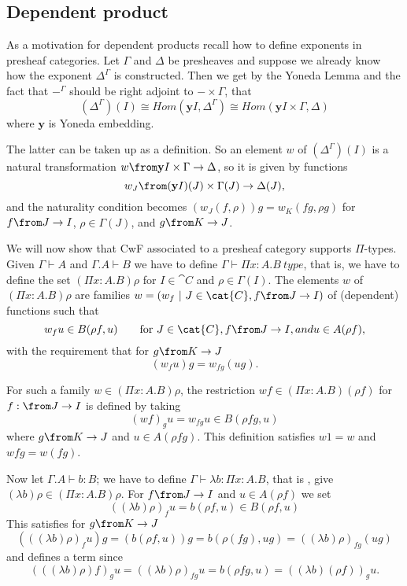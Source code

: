 \subsection*{Dependent product}

As a motivation for dependent products recall how to define exponents in
presheaf categories. Let $\Gamma$ and $\Delta$ be presheaves and suppose we
already know how the exponent $\Delta^\Gamma$ is constructed. Then we get by
the Yoneda Lemma and the fact that $-^\Gamma$ should be right adjoint to $-
\times \Gamma$, that
\[
  (\Delta^\Gamma)(I) \cong Hom(\mathbf{y}I, \Delta^\Gamma) \cong Hom(\mathbf{y}I \times \Gamma, \Delta)
\]
where $\mathbf{y}$ is Yoneda embedding.

The latter can be taken up as a definition. So an element $w$ of
$(\Delta^\Gamma)(I)$ is a natural transformation $w \from \mathbf{y}I\times
\Gamma \to \Delta$, so it is given by functions
\[
  w_J \from (\mathbf{y}I)(J) \times \Gamma(J) \to \Delta(J),
\]
and the naturality condition becomes $(w_J(f, \rho))g = w_K(fg, \rho g)$ for $f
\from J \to I$, $\rho \in \Gamma(J)$, and $g \from K \to J$.

We will now show that CwF associated to a presheaf category supports
$\Pi$-types. Given $\Gamma \vdash A$ and $\Gamma.A \vdash B$ we have to define
$\Gamma \vdash \Pi x: A. B~type$, that is, we have to define the set $(\Pi x:
A.B) \rho$ for $I \in \cat{C}$ and $\rho \in \Gamma(I)$. The elements $w$ of
$(\Pi x:A.B)\rho$ are families $w = (w_f~|~J\in \cat{C}, f \from J \to I)$ of
(dependent) functions such that
\[
  w_f u \in B(\rho f, u) \qquad \text{for $J \in \cat{C}, f \from J \to I, and u \in A(\rho f)$},
\]
with the requirement that for $g \from K \to J$
\[
  (w_f u)g = w_{fg}(ug).
\]

For such a family $w \in (\Pi x: A. B)\rho$, the restriction $wf \in (\Pi
x:A.B)(\rho f)$ for $f: \from J \to I$ is defined by taking
\[
  (w f)_g u = w_{fg}u \in B(\rho f g, u)
\]
where $g \from K \to J$ and $u \in A(\rho f g)$. This definition satisfies $w 1
= w$ and $w f g = w(f g)$.

Now let $\Gamma.A \vdash b : B$; we have to define $\Gamma \vdash \lambda b :
\Pi x:A.B$, that is , give $(\lambda b)\rho \in (\Pi x:A.B)\rho$. For $f \from
J \to I$ and $u \in A(\rho f)$ we set
\[
  ((\lambda b)\rho)_f u = b (\rho f, u) \in B(\rho f, u)
\]
This satisfies for $g \from K \to J$
\[
  (((\lambda b)\rho)_f u)g = (b(\rho f, u))g = b(\rho(fg), ug) = ((\lambda b)\rho)_{fg}(ug)
\]
and defines a term since
\[
  (((\lambda b)\rho)f)_g u = ((\lambda b) \rho)_{fg} u = b(\rho fg, u) = ((\lambda b)(\rho f))_g u.
\]

